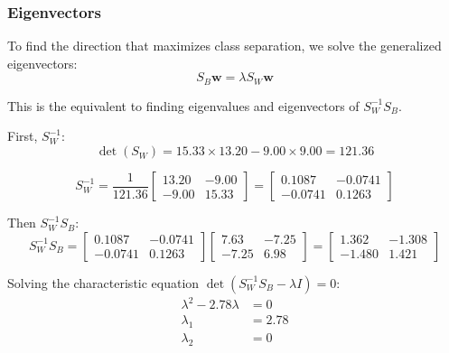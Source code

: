 \documentclass[12pt]{article}
\begin{document}
\subsubsection{Eigenvectors}
To find the direction that maximizes class separation, we solve the generalized eigenvectors:
\begin{equation}
    S_B \mathbf{w} = \lambda S_W \mathbf{w}
\end{equation}

This is the equivalent to finding eigenvalues and eigenvectors of $S_W^{-1}S_B$.

First, $S_W^{-1}$:
\begin{equation}
    \det(S_W) = 15.33 \times 13.20 - 9.00 \times 9.00 = 121.36
\end{equation}

\begin{equation}
    S_W^{-1} = \frac{1}{121.36}
    \begin{bmatrix}
        13.20 & -9.00 \\
        -9.00 & 15.33
    \end{bmatrix}
    =
    \begin{bmatrix}
        0.1087 & -0.0741 \\
        -0.0741 & 0.1263
    \end{bmatrix}
\end{equation}

Then $S_W^{-1}S_B$:
\begin{equation}
    S_W^{-1}S_B = 
    \begin{bmatrix}
        0.1087 & -0.0741 \\
        -0.0741 & 0.1263
    \end{bmatrix}
    \begin{bmatrix}
        7.63 & -7.25 \\
        -7.25 & 6.98
    \end{bmatrix}
    =
    \begin{bmatrix}
        1.362 & -1.308 \\
        -1.480 & 1.421
    \end{bmatrix}
\end{equation}


Solving the characteristic equation $\det(S_W^{-1}S_B - \lambda I) = 0$:
\begin{align}
    \lambda^2 - 2.78\lambda &= 0 \\
    \lambda_1 &= 2.78 \\
    \lambda_2 &= 0
\end{align}
\end{document}
